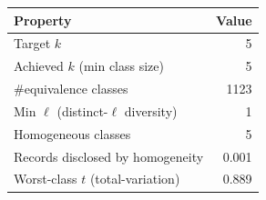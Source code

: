 \begin{tabular}{lr}
\toprule
Property & Value \\
\midrule
Target $k$ & 5 \\
Achieved $k$ (min class size) & 5 \\
\#equivalence classes & 1123 \\
Min $\ell$ (distinct-$\ell$ diversity) & 1 \\
Homogeneous classes & 5 \\
Records disclosed by homogeneity & 0.001 \\
Worst-class $t$ (total-variation) & 0.889 \\
\bottomrule
\end{tabular}
